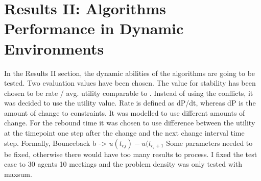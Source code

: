 %
%
%

%

\section{Results II: Algorithms Performance in Dynamic Environments}

In the Results II section, the dynamic abilities of the algorithms are going to be tested. Two evaluation values have been chosen. The value for stability has been chosen to be rate / avg. utility comparable to  \cite{Mailler2014}. Instead of using the conflicts, it was decided to use the utility value. Rate is defined as dP/dt, whereas dP is the amount of change to constraints. It was modelled to use different amounts of change. For the rebound time it was chosen to use difference between the utility at the timepoint one step after the change and the next change interval time step. Formally, Bounceback b -> \(u(t_{cj})-u(t_{c_i+1}\) 
Some parameters needed to be fixed, otherwise there would have too many results to process. I fixed the test case to 30 agents 10 meetings and the problem density was only tested with maxsum.

